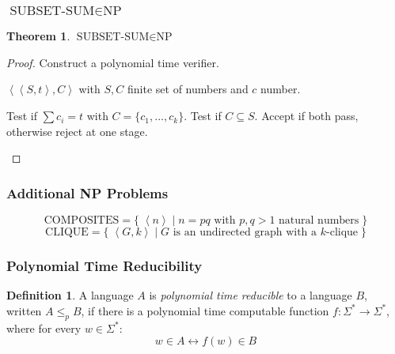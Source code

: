 \documentclass[notheorems]{beamer}
\theoremstyle{definition}
\newtheorem{definition}{Definition}
\newtheorem{theorem}{Theorem}
\theoremstyle{remark}
\newcommand{\npclass}{\text{NP}}
\newcommand{\compositesprob}{\text{COMPOSITES}}
\newcommand{\cliqueprob}{\text{CLIQUE}}
\newcommand{\subsetsumprob}{\text{SUBSET-SUM}}
\newcommand{\lpp}{\left \langle}
\newcommand{\rpp}{\right \rangle}
\newcommand{\enc}[1]{\lpp #1 \rpp}
\begin{document}
\begin{frame}
    \frametitle{\(\subsetsumprob \in \npclass\)}

    \begin{theorem}
        \(\subsetsumprob \in \npclass\)
    \end{theorem}

    \pause

    \begin{proof} Construct a polynomial time verifier.

        \pause

        \begin{description}
            \small
            \item[Input:] \(\enc{\enc{S, t}, C}\) with \(S, C\) finite set of numbers and \(c\) number.
            \item[Function:] \phantom{}
                  \begin{algorithmic}[1]
                      \State Test if \(\textstyle\sum c_i = t\) with \(C = \{c_1, ..., c_k\}\).
                      \State Test if \(C \subseteq S\).
                      \State Accept if both pass, otherwise reject at one stage.
                  \end{algorithmic}
        \end{description}
    \end{proof}

\end{frame}

\begin{frame}
    \frametitle{Additional NP Problems}

    \pause
    \[
        \compositesprob = \{ \; \enc{n} \mid n = pq \text{ with } p, q > 1 \text{ natural numbers} \; \}
    \]
    \pause
    \[
        \cliqueprob = \{ \; \enc{G, k} \mid G \text{ is an undirected graph with a } k\text{-clique} \; \}
    \]

\end{frame}

\begin{frame}
    \frametitle{Polynomial Time Reducibility}

    \begin{definition} A language \(A\) is \emph{polynomial time reducible} to a language \(B\), written \(A \leq_p B\), if there is a polynomial time computable function \(f\colon \Sigma^* \rightarrow \Sigma^*\), where for every \(w \in \Sigma^*\):
        \[
            w \in A \leftrightarrow f(w) \in B
        \]
    \end{definition}

\end{frame}
\end{document}
